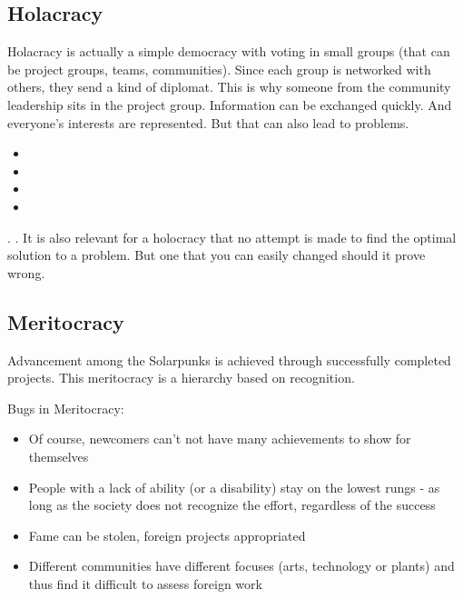\subsection{Holacracy}
Holacracy is actually a simple democracy with voting in small groups (that can be project groups, teams, communities). Since each group is networked with others, they send a kind of diplomat. This is why someone from the community leadership sits in the project group. Information can be exchanged quickly. And everyone's interests are represented. But that can also lead to problems.

\begin{solartalk}[]
    \begin{itemize}
        \item {}
        \item {}
        \item {}
        \item {}
    \end{itemize}
\end{solartalk}

. . It is also relevant for a holocracy that no attempt is made to find the optimal solution to a problem.
But one that you can easily changed should it prove wrong.

\subsection{Meritocracy}
Advancement among the Solarpunks is achieved through successfully completed projects. This meritocracy is a hierarchy based on recognition.

Bugs in Meritocracy:

\begin{itemize}
    \item Of course, newcomers can't not have many achievements to show for themselves
    \item People with a lack of ability (or a disability) stay on the lowest rungs - as long as the society does not recognize the effort, regardless of the success
    \item Fame can be stolen, foreign projects appropriated
    \item Different communities have different focuses (arts, technology or plants) and thus find it difficult to assess foreign work
\end{itemize}

